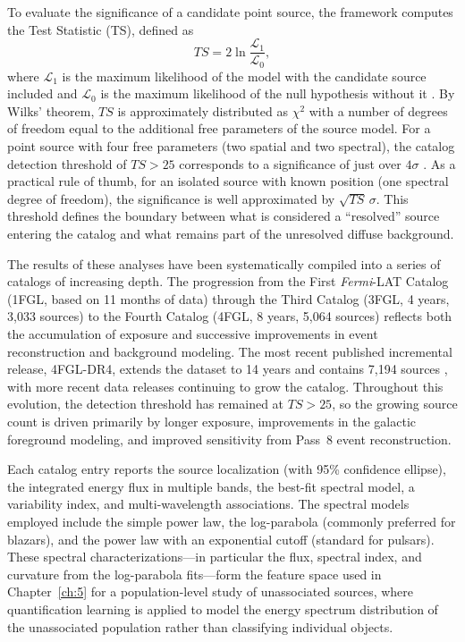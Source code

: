 To evaluate the significance of a candidate point source, the framework computes the Test Statistic (TS), defined as \[ TS = 2\ln\frac{\mathcal{L}_1}{\mathcal{L}_0}, \] where $\mathcal{L}_1$ is the maximum likelihood of the model with the candidate source included and $\mathcal{L}_0$ is the maximum likelihood of the null hypothesis without it \cite{Mattox:1996zz}.
By Wilks' theorem, $TS$ is approximately distributed as $\chi^2$ with a number of degrees of freedom equal to the additional free parameters of the source model.
For a point source with four free parameters (two spatial and two spectral), the catalog detection threshold of $TS > 25$ corresponds to a significance of just over $4\sigma$ \cite{Fermi-LAT:2015bhf,Fermi-LAT:2019yla}.
As a practical rule of thumb, for an isolated source with known position (one spectral degree of freedom), the significance is well approximated by $\sqrt{TS}\,\sigma$.
This threshold defines the boundary between what is considered a ``resolved'' source entering the catalog and what remains part of the unresolved diffuse background.

The results of these analyses have been systematically compiled into a series of catalogs of increasing depth.
The progression from the First \textit{Fermi}-LAT Catalog (1FGL, based on 11 months of data) through the Third Catalog (3FGL, 4 years, 3,033 sources) to the Fourth Catalog (4FGL, 8 years, 5,064 sources) \cite{Fermi-LAT:2015bhf,Fermi-LAT:2019yla} reflects both the accumulation of exposure and successive improvements in event reconstruction and background modeling.
The most recent published incremental release, 4FGL-DR4, extends the dataset to 14 years and contains 7,194 sources \cite{2023arXiv230712546B}, with more recent data releases continuing to grow the catalog.
Throughout this evolution, the detection threshold has remained at $TS > 25$, so the growing source count is driven primarily by longer exposure, improvements in the galactic foreground modeling, and improved sensitivity from Pass~8 event reconstruction.

Each catalog entry reports the source localization (with 95\% confidence ellipse), the integrated energy flux in multiple bands, the best-fit spectral model, a variability index, and multi-wavelength associations.
The spectral models employed include the simple power law, the log-parabola (commonly preferred for blazars), and the power law with an exponential cutoff (standard for pulsars).
These spectral characterizations---in particular the flux, spectral index, and curvature from the log-parabola fits---form the feature space used in Chapter~\ref{ch:5} for a population-level study of unassociated sources, where quantification learning is applied to model the energy spectrum distribution of the unassociated population rather than classifying individual objects.

